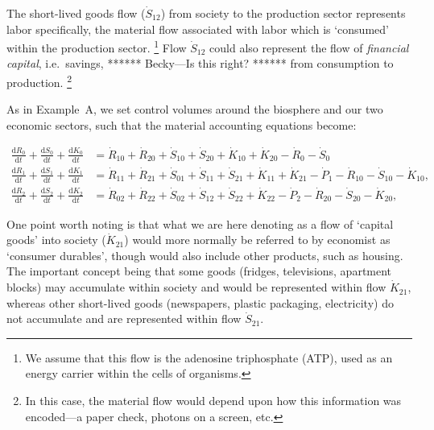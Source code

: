 The short-lived goods flow ($\dot{S}_{12}$)
from society to the production sector 
represents labor specifically, 
the material flow associated with labor 
which is `consumed' within the production sector.
\footnote{We assume that this flow is the 
adenosine triphosphate (ATP), 
used as an energy
carrier within the cells of organisms.} 
Flow $\dot{S}_{12}$ could also represent the flow of 
\emph{financial capital}, 
i.e.\ savings, ****** Becky---Is this right? ****** 
from consumption to production.
\footnote{In this case, 
the material flow would depend upon how 
this information was encoded---a paper check, 
photons on a screen, etc.}

As in Example~A, 
we set control volumes around the biosphere 
and our two economic sectors, 
such that the material accounting equations become:

\begin{align} \label{eq:B_CV_0_to_2}
	\frac{\mathrm{d}R_{0}}{\mathrm{d}t} 
	+ \frac{\mathrm{d}S_{0}}{\mathrm{d}t}	
	+ \frac{\mathrm{d}K_0}{\mathrm{d}t}		&
	=  \dot{R}_{10} + \dot{R}_{20} 
	+ \dot{S}_{10} + \dot{S}_{20} 
	+ \dot{K}_{10} + \dot{K}_{20} 
	- \dot{R}_{0} 
	- \dot{S}_{0} 							\\
	\frac{\mathrm{d}R_{1}}{\mathrm{d}t} 
	+ \frac{\mathrm{d}S_{1}}{\mathrm{d}t}	
	+ \frac{\mathrm{d}K_{1}}{\mathrm{d}t}	&
	=  \dot{R}_{11} 
	+ \dot{R}_{21}
	+ \dot{S}_{01} 
	+ \dot{S}_{11} 
	+ \dot{S}_{21}
	+ \dot{K}_{11}
	+ \dot{K}_{21}
	- \dot{P}_{1} 
	- \dot{R}_{10} 
	- \dot{S}_{10} 
	- \dot{K}_{10},							\\
	\frac{\mathrm{d}R_{2}}{\mathrm{d}t} 
	+ \frac{\mathrm{d}S_{2}}{\mathrm{d}t}
	+ \frac{\mathrm{d}K_{2}}{\mathrm{d}t}	&
	=  \dot{R}_{02} 
	+ \dot{R}_{22} 
	+ \dot{S}_{02} 
	+ \dot{S}_{12} 
	+ \dot{S}_{22} 
	+ \dot{K}_{22}
	- \dot{P}_{2}
	- \dot{R}_{20} 
	- \dot{S}_{20} 
	- \dot{K}_{20},
\end{align}

One point worth noting is that what we are here denoting as a flow of `capital goods'
into society ($\dot{K}_{21}$) would more normally be referred to by economist as `consumer
durables', though would also include other products, such as housing. The important concept
being that some goods (fridges, televisions, apartment blocks) may accumulate within society
and would be represented within flow $\dot{K}_{21}$, whereas other short-lived goods
(newspapers, plastic packaging, electricity) do not accumulate and are represented within
flow $\dot{S}_{21}$.


